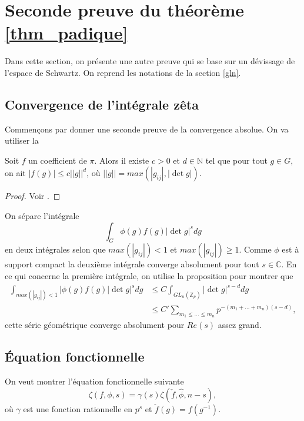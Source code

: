 \section{Seconde preuve du théorème \ref{thm_padique}}

Dans cette section, on présente une autre preuve qui se base sur un dévissage de l'espace de Schwartz. On reprend les notations de la section \ref{gln}. 

\subsection{Convergence de l'intégrale zêta}

Commençons par donner une seconde preuve de la convergence absolue. On va utiliser la
\begin{proposition}
Soit $f$ un coefficient de $\pi$. Alors il existe $c > 0$ et $d \in \mathbb{N}$ tel que pour tout $g \in G$, on ait $|f(g)| \leq c ||g||^d$, où $||g|| = max(|g_{ij}|, |\det g|)$.
\end{proposition}

\begin{proof}
Voir \cite[Corollaire I.4.4]{waldspurger}.
\end{proof}

On sépare l'intégrale
\begin{equation}
\int_G \phi(g)f(g)|\det g|^s dg
\end{equation}
en deux intégrales selon que $max(|g_{ij}|) < 1$ et $max(|g_{ij}|) \geq 1$. Comme $\phi$ est à support compact la deuxième intégrale converge absolument pour tout $s \in \mathbb{C}$. En ce qui concerne la première intégrale, on utilise la proposition pour montrer que
\begin{align}
\int_{max(|g_{ij}|) < 1}|\phi(g)f(g)|\det g|^s dg &\leq C \int_{GL_n(\mathbb{Z}_p)} |\det g|^{s-d} dg \\
&\leq C' \sum_{m_1 \leq ... \leq m_n} p^{-(m_1+...+m_n)(s-d)},
\end{align}
cette série géométrique converge absolument pour $Re(s)$ assez grand.

\subsection{Équation fonctionnelle}
On veut montrer l'équation fonctionnelle suivante
\begin{equation}
\zeta(f, \phi, s) = \gamma(s) \zeta(\check{f}, \hat{\phi}, n-s),
\end{equation}
où $\gamma$ est une fonction rationnelle en $p^s$ et $\check{f}(g) = f(g^{-1})$.

